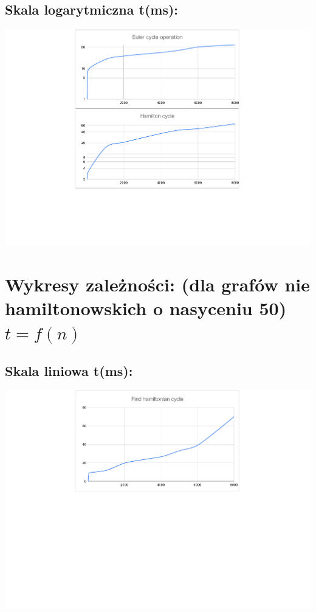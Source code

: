 \documentclass[12pt]{article}
\begin{document}
\subsection{Skala logarytmiczna t(ms): }

\begin{center}

\includegraphics[width=\linewidth]{wykres_logarytmiczny_0.pdf}

\end{center}

\section{Wykresy zależności: (dla grafów nie hamiltonowskich o nasyceniu 50) $ t = f(n) $}

\subsection{Skala liniowa t(ms): }

\begin{center}

\includegraphics[width=\linewidth]{wykres_liniowy_1.pdf}

\end{center}
\end{document}
